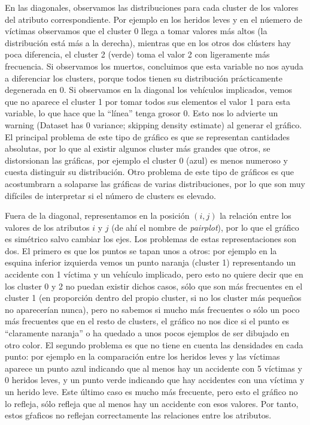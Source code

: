\documentclass[oneside]{book}
\begin{document}
En las diagonales, observamos las distribuciones para cada cluster de
los valores del atributo correspondiente. Por ejemplo en los heridos
leves y en el núemero de víctimas observamos que el cluster 0 llega a
tomar valores más altos (la distribución está más a la derecha),
mientras que en los otros dos clústers hay poca diferencia, el cluster
2 (verde) toma el valor 2 con ligeramente más frecuencia. Si
observamos los muertos, concluimos que esta variable no nos ayuda a
diferenciar los clusters, porque todos tienen su distribución
prácticamente degenerada en 0. Si observamos en la diagonal los
vehículos implicados, vemos que no aparece el cluster 1 por tomar
todos sus elementos el valor 1 para esta variable, lo que hace que la
``línea'' tenga grosor 0. Esto nos lo advierte un warning (Dataset has
0 variance; skipping density estimate) al generar el gráfico. El
principal problema de este tipo de gráfico es que se representan
cantidades absolutas, por lo que al existir algunos cluster más
grandes que otros, se distorsionan las gráficas, por ejemplo el
cluster 0 (azul) es menos numeroso y cuesta distinguir su
distribución. Otro problema de este tipo de gráficos es que
acostumbrarn a solaparse las gráficas de varias distribuciones, por lo
que son muy difíciles de interpretar si el número de clusters es
elevado.

Fuera de la diagonal, representamos en la posición $(i,j)$ la relación
entre los valores de los atributos $i$ y $j$ (de ahí el nombre de
\textit{pairplot}), por lo que el gráfico es simétrico salvo cambiar
los ejes. Los problemas de estas representaciones son dos. El primero
es que los puntos se tapan unos a otros: por ejemplo en la esquina
inferior izquierda vemos un punto naranja (cluster 1) representando un
accidente con 1 víctima y un vehículo implicado, pero esto no quiere
decir que en los cluster 0 y 2 no puedan existir dichos casos, sólo
que son más frecuentes en el cluster 1 (en proporción dentro del
propio cluster, si no los cluster más pequeños no aparecerían nunca),
pero no sabemos si mucho más frecuentes o sólo un poco más frecuentes
que en el resto de clusters, el gráfico no nos dice si el punto es
``claramente naranja'' o ha quedado a unos pocos ejemplos de ser
dibujado en otro color. El segundo problema es que no tiene en cuenta
las densidades en cada punto: por ejemplo en la comparación entre los
heridos leves y las víctimas aparece un punto azul indicando que al
menos hay un accidente con 5 víctimas y 0 heridos leves, y un punto
verde indicando que hay accidentes con una víctima y un herido
leve. Este último caso es mucho más frecuente, pero esto el gráfico no
lo refleja, sólo refleja que al menos hay un accidente con esos
valores. Por tanto, estos gŕaficos no reflejan correctamente las
relaciones entre los atributos.
\end{document}
